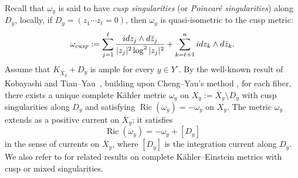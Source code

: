 \documentclass[a4paper, 11pt]{amsart}
\theoremstyle{plain}
\numberwithin{equation}{section} %
\numberwithin{figure}{section} %
\theoremstyle{plain}
\theoremstyle{plain}
\theoremstyle{plain}
\theoremstyle{plain}
\theoremstyle{remark}
\theoremstyle{definition}
\theoremstyle{definition}
\DeclareMathOperator \Ric {\textrm{Ric}}
\begin{document}
Recall that $\omega_y$ is said to have {\em cusp singularities} (or {\em Poincar\'e singularities}) along $D_y$, locally, if $D_y=(z_1\cdots z_\ell=0)$, then $\omega_y$ is quasi-isometric to the cusp
metric: \[\omega_{\rm cusp}:=\sum_{j=1}^\ell\frac{i dz_j\wedge d\Bar z_j}{|z_j|^2\log^2|z_j|^2}+\sum_{k=\ell+1}^n idz_k\wedge d\Bar z_k. \]
Assume that $K_{\overline{X}_y} + D_y$ is ample for every $y \in Y^\circ$. By the well-known result of Kobayashi \cite{Kobayashi84-KE-open} and Tian--Yau~\cite{TianYau87-KE-complete}, building upon Cheng--Yau’s method \cite{ChengYau80-complete}, for each fiber, there exists a unique complete K\"ahler metric $\omega_y$ on $X_y := \overline{X}_y \setminus D_y$ with cusp singularities along $D_y$ and satisfying $\Ric(\omega_y) = -\omega_y$ on $X_y$.  The metric $\omega_y$ extends as a positive current on $\overline{X}_y$; it satisfies \begin{equation}\label{eq: KE-cusp0}
    \Ric(\omega_y)=-\omega_y+[D_{y}]
\end{equation} in the sense of currents on $\overline{X}_y$, where $[D_y]$ is the integration current along $D_y$. We also refer to \cite{bando90-negative-open,Wu08-negative-quasi-proj, Auvray17-Poincare-metrics-divisor, guenancia14-kahler-mixed, Berman-Guenancia14-logcanonical, DiNezza-Lu-cMA-quasi, Guenancia_Wu_2016, Guenancia20-cones-cusps, Biquard-Guenancia-22-degnerating,
dang2023kahler} for related results on complete K\"ahler--Einstein metrics with cusp or mixed singularities.
\end{document}

